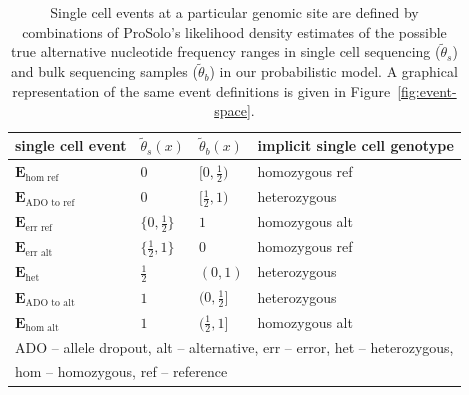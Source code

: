 \documentclass[authoryear,preprint,11pt]{scrartcl}
\begin{document}
\begin{center}
 \begin{table}[tbp]
  \caption{
   Single cell events at a particular genomic site are defined by combinations of ProSolo's likelihood density estimates of the possible true alternative nucleotide frequency ranges in single cell sequencing ($\tilde{\theta}_s$) and bulk sequencing samples ($\tilde{\theta}_b$) in our probabilistic model.
   A graphical representation of the same event definitions is given in Figure~\ref{fig:event-space}.
  }
  \label{tab:Events}
  \renewcommand{\arraystretch}{0.9}

  \begin{tabular}{p{22ex}p{12ex}p{12ex}p{33ex}}
   \toprule
   single cell event & $\tilde{\theta}_s(x)$   & $\tilde{\theta}_b(x)$ & implicit single cell genotype \\
   \toprule
   $\boldsymbol{E}_{\text{hom ref}}$      & $0$             & $[0,\frac12)$ & homozygous ref                \\
       \midrule
   $\boldsymbol{E}_{\text{ADO to ref}}$   & $0$             & $[\frac12,1)$ & heterozygous                  \\
         \midrule
   $\boldsymbol{E}_{\text{err ref}}$      & $\{0,\frac12\}$ & $1$           & homozygous alt                \\
         \midrule
   $\boldsymbol{E}_{\text{err alt}}$      & $\{\frac12,1\}$ & $0$           & homozygous ref                \\
         \midrule
   $\boldsymbol{E}_{\text{het}}$          & $\frac12$       & $(0,1)$       & heterozygous                  \\
         \midrule
   $\boldsymbol{E}_{\text{ADO to alt}}$   & $1$             & $(0,\frac12]$ & heterozygous                  \\
       \midrule
   $\boldsymbol{E}_{\text{hom alt}}$      & $1$             & $(\frac12,1]$ & homozygous alt                \\
   \bottomrule
   \multicolumn{4}{l}{\footnotesize ADO -- allele dropout, alt -- alternative, err -- error, het -- heterozygous,}\\
   \multicolumn{4}{l}{\footnotesize hom -- homozygous, ref -- reference} \\
   \bottomrule
  \end{tabular}
 \end{table}
\end{center}
\end{document}
